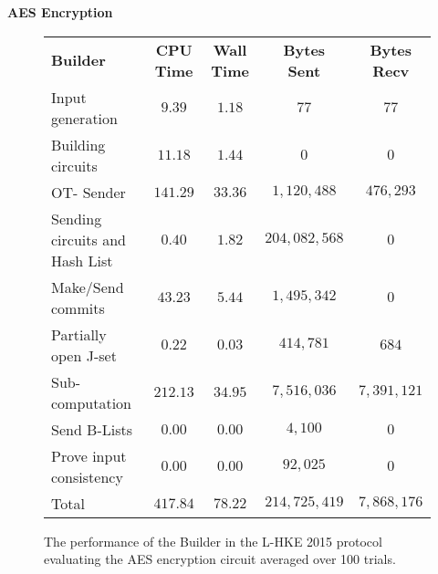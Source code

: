 \documentclass[ %
                    author={Nicholas Tutte},
                supervisor={Prof. Nigel Smart},
                    degree={MEng},
                     title={Secure Two Party Computation},
                  subtitle={A practical comparison of recent protocols},
                      type={Research - GG1K},
                      year={2015} ]{dissertation}
\begin{document}
				\FloatBarrier
				\noindent \textbf{AES Encryption}
				\begin{figure}[!ht]
					\begin{tabular}{| p{4.3cm} | c c c c |}
						\hline
						\textbf{Builder} & \textbf{CPU Time} & \textbf{Wall Time} & \textbf{Bytes Sent} & \textbf{Bytes Recv} \\
						\thickhline
						Input generation & $9.39$ & $1.18$ & $77$ & $77$ \\
						\hline
						Building circuits & $11.18$ & $1.44$ & $0$ & $0$ \\
						\hline
						OT- Sender & $141.29$ & $33.36$ & $1,120,488$ & $476,293$ \\
						\hline
						Sending circuits and Hash List & $0.40$ & $1.82$ & $204,082,568$ & $0$ \\
						\hline
						Make/Send commits & $43.23$ & $5.44$ & $1,495,342$ & $0$ \\
						\hline
						Partially open J-set & $0.22$ & $0.03$ & $414,781$ & $684$ \\
						\hline
						Sub-computation & $212.13$ & $34.95$ & $7,516,036$ & $7,391,121$ \\
						\hline
						Send B-Lists & $0.00$ & $0.00$ & $4,100$ & $0$ \\
						\hline
						Prove input consistency & $0.00$ & $0.00$ & $92,025$ & $0$ \\
						\thickhline
						Total & $417.84$ & $78.22$ & $214,725,419$ & $7,868,176$ \\
						\hline
					\end{tabular}
					\caption{The performance of the Builder in the L-HKE 2015 protocol evaluating the AES encryption circuit averaged over 100 trials. \label{table:L-HKE_2015_AES_Builder}}
				\end{figure}
\end{document}
